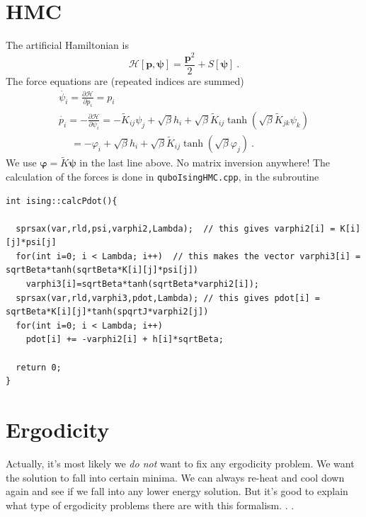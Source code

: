 \documentclass[11pt]{article}
\begin{document}
\section{HMC}
The artificial Hamiltonian is
\begin{equation}
\mathcal{H}[\bm p,\bm \psi]=\frac{\bm p^2}{2}+S[\bm \psi]\ .
\end{equation}
The force equations are (repeated indices are summed)
\begin{equation}
\begin{array}{l}
{\dot{\psi_i}=\frac{\partial \mathcal{H}}{\partial p_i}=p_i} \\
{\dot{p_i}=-\frac{\partial \mathcal{H}}{\partial\psi_i}=-\tilde{K}_{ij} \psi_j+\sqrt{\beta}h_i+\sqrt{\beta} \tilde{K}_{ij} \tanh (\sqrt{\beta} \tilde{K}_{jk} \psi_k)}\\
{\quad\ =-\varphi_i+\sqrt{\beta}h_i+\sqrt{\beta} \tilde{K}_{ij} \tanh (\sqrt{\beta} \varphi_j)}\ .
\end{array}
\end{equation}
We use $\bm \varphi=\tilde K\bm \psi$ in the last line above. No matrix inversion anywhere!   The calculation of the forces is done in \texttt{quboIsingHMC.cpp}, in the subroutine
{\tiny
\begin{lstlisting}
int ising::calcPdot(){

  sprsax(var,rld,psi,varphi2,Lambda);  // this gives varphi2[i] = K[i][j]*psi[j]
  for(int i=0; i < Lambda; i++)  // this makes the vector varphi3[i] = sqrtBeta*tanh(sqrtBeta*K[i][j]*psi[j])
    varphi3[i]=sqrtBeta*tanh(sqrtBeta*varphi2[i]);
  sprsax(var,rld,varphi3,pdot,Lambda); // this gives pdot[i] = sqrtBeta*K[i][j]*tanh(spqrtJ*varphi2[j])
  for(int i=0; i < Lambda; i++)
    pdot[i] += -varphi2[i] + h[i]*sqrtBeta;

  return 0;
}
\end{lstlisting}
}

\section{Ergodicity}
Actually, it's most likely we \emph{do not} want to fix any ergodicity problem.  We want the solution to fall into certain minima.  We can always re-heat and cool down again and see if we fall into any lower energy solution.  But it's good to explain what type of ergodicity problems there are with this formalism. . .

%
\end{document}
